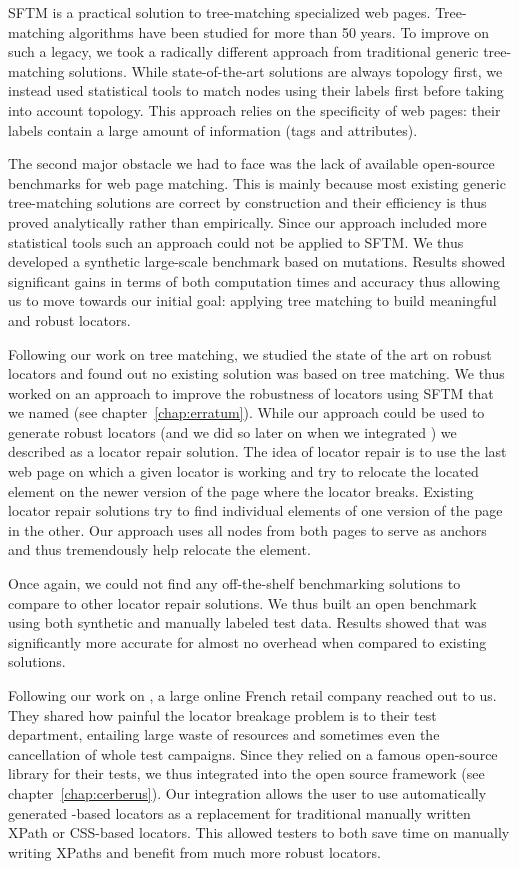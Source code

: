 SFTM is a practical solution to tree-matching specialized web pages.
Tree-matching algorithms have been studied for more than 50 years.
To improve on such a legacy, we took a radically different approach from traditional generic tree-matching solutions.
While state-of-the-art solutions are always topology first, we instead used statistical tools to match nodes using their labels first before taking into account topology.
This approach relies on the specificity of web pages: their labels contain a large amount of information (tags and attributes).

The second major obstacle we had to face was the lack of available open-source benchmarks for web page matching. This is mainly because most existing generic tree-matching solutions are correct by construction and their efficiency is thus proved analytically rather than empirically.
Since our approach included more statistical tools such an approach could not be applied to SFTM.
We thus developed a synthetic large-scale benchmark based on mutations. Results showed significant gains in terms of both computation times and accuracy thus allowing us to move towards our initial goal: applying tree matching to build meaningful and robust locators.

Following our work on tree matching, we studied the state of the art on robust locators and found out no existing solution was based on tree matching. 
We thus worked on an approach to improve the robustness of locators using SFTM that we named \erratum{} (see chapter~\ref{chap:erratum}).
While our approach could be used to generate robust locators (and we did so later on when we integrated \erratum{}) we described \erratum{} as a locator repair solution.
The idea of locator repair is to use the last web page on which a given locator is working and try to relocate the located element on the newer version of the page where the locator breaks.
Existing locator repair solutions try to find individual elements of one version of the page in the other.
Our approach uses all nodes from both pages to serve as anchors and thus tremendously help relocate the element.

Once again, we could not find any off-the-shelf benchmarking solutions to compare \erratum{} to other locator repair solutions.
We thus built an open benchmark using both synthetic and manually labeled test data. 
Results showed that \erratum{} was significantly more accurate for almost no overhead when compared to existing solutions.

Following our work on \erratum{}, a large online French retail company reached out to us.
They shared how painful the locator breakage problem is to their test department, entailing large waste of resources and sometimes even the cancellation of whole test campaigns.
Since they relied on a famous open-source library for their tests, we thus integrated \erratum{} into the open source framework (see chapter~\ref{chap:cerberus}).
Our integration allows the user to use automatically generated \erratum{}-based locators as a replacement for traditional manually written XPath or CSS-based locators.
This allowed testers to both save time on manually writing XPaths and benefit from much more robust locators. 

